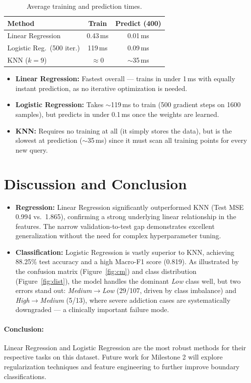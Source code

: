 \documentclass[10pt, twocolumn, letterpaper]{article}
\begin{document}
\begin{table}[H]
\centering
\caption{Average training and prediction times.}
\label{tab:runtime}
\setlength{\tabcolsep}{4pt}
\begin{tabular}{@{}lcc@{}}
\toprule
\textbf{Method} & \textbf{Train} & \textbf{Predict (400)} \\
\midrule
Linear Regression          & 0.43\,ms  & 0.01\,ms \\
Logistic Reg.\ (500 iter.) & 119\,ms   & 0.09\,ms \\
KNN ($k{=}9$)              & $\approx$0 & $\sim$35\,ms \\
\bottomrule
\end{tabular}
\end{table}

\begin{itemize}[noitemsep, leftmargin=*]
    \item \textbf{Linear Regression:} Fastest overall — trains in under 1\,ms with equally instant prediction, as no iterative optimization is needed.
    \item \textbf{Logistic Regression:} Takes $\sim$119\,ms to train (500 gradient steps on 1600 samples), but predicts in under 0.1\,ms once the weights are learned.
    \item \textbf{KNN:} Requires no training at all (it simply stores the data), but is the slowest at prediction ($\sim$35\,ms) since it must scan all training points for every new query.
\end{itemize}

\section{Discussion and Conclusion}
\begin{itemize}[leftmargin=*]
    \item \textbf{Regression:} Linear Regression significantly outperformed KNN (Test MSE 0.994 vs.\ 1.865), confirming a strong underlying linear relationship in the features. The narrow validation-to-test gap demonstrates excellent generalization without the need for complex hyperparameter tuning.
    \item \textbf{Classification:} Logistic Regression is vastly superior to KNN, achieving 88.25\% test accuracy and a high Macro-F1 score (0.819). As illustrated by the confusion matrix (Figure~\ref{fig:cm}) and class distribution (Figure~\ref{fig:dist}), the model handles the dominant \emph{Low} class well, but two errors stand out: \emph{Medium}$\to$\emph{Low} (29/107, driven by class imbalance) and \emph{High}$\to$\emph{Medium} (5/13), where severe addiction cases are systematically downgraded — a clinically important failure mode.
\end{itemize}

\paragraph{Conclusion:} Linear Regression and Logistic Regression are the most robust methods for their respective tasks on this dataset. Future work for Milestone 2 will explore regularization techniques and feature engineering to further improve boundary classifications.
\end{document}
